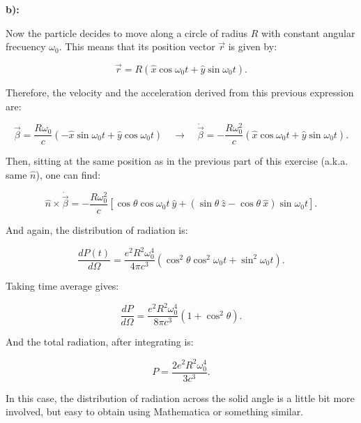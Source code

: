 \textbf{b):}

Now the particle decides to move along a circle of radius $R$ with constant angular frecuency $\omega_{0}$. This means that its position vector $\vec{r}$ is given by:

\begin{equation}
	\vec{r}=R\left(\hat{x} \cos \omega_{0} t+\hat{y} \sin \omega_{0} t\right).
\end{equation}

Therefore, the velocity and the acceleration derived from this previous expression are:

\begin{equation}
	\vec{\beta}=\frac{R \omega_{0}}{c}\left(-\hat{x} \sin \omega_{0} t+\hat{y} \cos \omega_{0} t\right) \quad \rightarrow \quad
	\dot{\vec{\beta}}=-\frac{R \omega_{0}^{2}}{c}\left(\hat{x} \cos \omega_{0} t+\hat{y} \sin \omega_{0} t\right).
	\end{equation}

Then, sitting at the same position as in the previous part of this exercise (a.k.a. same $\hat{n}$), one can find:

\begin{equation}
	\hat{n} \times \dot{\vec{\beta}}=-\frac{R \omega_{0}^{2}}{c}\left[ \cos \theta \cos \omega_{0} t \: \hat{y}+( \sin \theta \: \hat{z} - \cos \theta \: \hat{x}) \sin \omega_{0} t\right].
\end{equation}

And again, the distribution of radiation is:

\begin{equation}
	\frac{d P(t)}{d \Omega}=\frac{e^{2} R^{2} \omega_{0}^{4}}{4 \pi c^{3}}\left(\cos ^{2} \theta \cos ^{2} \omega_{0} t+\sin ^{2} \omega_{0} t\right).
\end{equation}

Taking time average gives:

\begin{equation}
	\frac{d P}{d \Omega}=\frac{e^{2} R^{2} \omega_{0}^{4}}{8 \pi c^{3}}\left(1+\cos ^{2} \theta\right).
\end{equation}

And the total radiation, after integrating is:

\begin{equation}
	P=\frac{2 e^{2} R^{2} \omega_{0}^{4}}{3 c^{3}}.
\end{equation}

In this case, the distribution of radiation across the solid angle is a little bit more involved, but easy to obtain using Mathematica or something similar.

